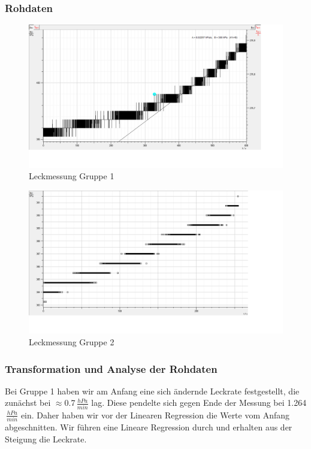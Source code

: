 \documentclass[12pt,a4paper]{article}
\begin{document}
\subsubsection{Rohdaten}

\begin{figure}[H]
\centering
\includegraphics[scale=0.3]{Bilder/dichtigkeit_raw_JM.png}
\caption{Leckmessung Gruppe 1}
\end{figure}

\begin{figure}[H]
\centering
\includegraphics[scale=0.3]{Bilder/dichtigkeit_raw_EL.png}
\caption{Leckmessung Gruppe 2}
\end{figure}

\subsubsection{Transformation und Analyse der Rohdaten}

Bei Gruppe 1 haben wir am Anfang eine sich ändernde Leckrate festgestellt, die zunächst bei $\approx$0.7$\,\frac{hPa}{min}$ lag. Diese pendelte sich gegen Ende der Messung bei 1.264$\,\frac{hPa}{min}$ ein. Daher haben wir vor der Linearen Regression die Werte vom Anfang abgeschnitten. Wir führen eine Lineare Regression durch und erhalten aus der Steigung die Leckrate.
\end{document}
